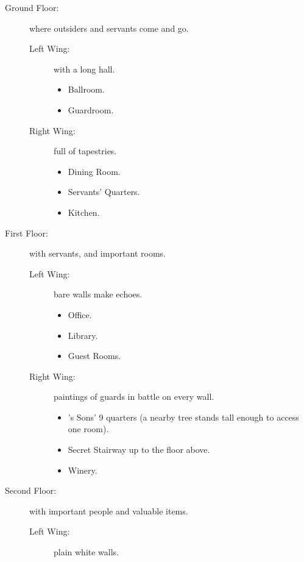 \begin{multicols}{2}
\begin{description}
  \item[Ground Floor:]
  where outsiders and servants come and go.
    \begin{description}
      \item[Left Wing:]
      with a long hall.
      \begin{itemize}
        \item
        Ballroom.
        \item
        Guardroom.
      \end{itemize}
      \item[Right Wing:]
      full of tapestries.
      \begin{itemize}
        \item
        Dining Room.
        \item
        Servants' Quarters.
        \item
        Kitchen.
      \end{itemize}
    \end{description}
  \item[First Floor:]
  with servants, and important rooms.
    \begin{description}
      \item[Left Wing:]
      bare walls make echoes.
      \begin{itemize}
        \item
        Office.
        \item
        Library.
        \item
        Guest Rooms.
      \end{itemize}
      \item[Right Wing:]
      paintings of \glspl{guard} in battle on every wall.
      \begin{itemize}
        \item
        's Sons' 9 quarters (a nearby tree stands tall enough to access one room).
        \item
        Secret Stairway up to the floor above.
        \item
        Winery.
      \end{itemize}
    \end{description}
  \item[Second Floor:]
  with important people and valuable items.
    \begin{description}
      \item[Left Wing:]
      plain white walls.

\end{description}
\end{description}
\end{multicols}
